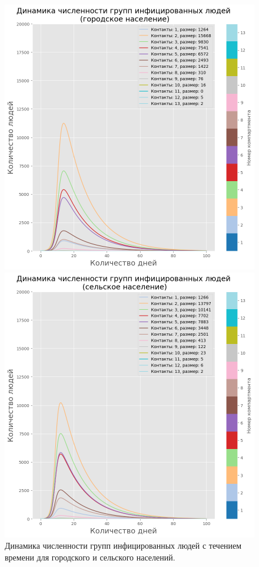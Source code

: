 \documentclass[14pt,a4paper]{article}
\begin{document}
\begin{figure}[h!]
	\begin{minipage}{0.5\textwidth}
		\centering
		\includegraphics[width=\linewidth]{img/sir_model_compare_I_urban_new.png}
	\end{minipage}
	\begin{minipage}{0.5\textwidth}
		\centering
		\includegraphics[width=\linewidth]{img/sir_model_compare_I_rural_new.png}
	\end{minipage}
	\caption{Динамика численности групп инфицированных людей с течением времени для городского и сельского населений.}
	\label{fig:disease_spreading_I}
\end{figure}
\end{document}

